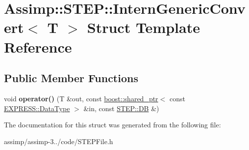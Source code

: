 \hypertarget{struct_assimp_1_1_s_t_e_p_1_1_intern_generic_convert}{\section{Assimp\+:\+:S\+T\+E\+P\+:\+:Intern\+Generic\+Convert$<$ T $>$ Struct Template Reference}
\label{struct_assimp_1_1_s_t_e_p_1_1_intern_generic_convert}
}
\subsection*{Public Member Functions}
\begin{DoxyCompactItemize}
\item 
\hypertarget{struct_assimp_1_1_s_t_e_p_1_1_intern_generic_convert_afcb7f85dbff0d736175b786d2e45bbfe}{void {\bfseries operator()} (T \&out, const \hyperlink{classboost_1_1shared__ptr}{boost\+::shared\+\_\+ptr}$<$ const \hyperlink{class_assimp_1_1_s_t_e_p_1_1_e_x_p_r_e_s_s_1_1_data_type}{E\+X\+P\+R\+E\+S\+S\+::\+Data\+Type} $>$ \&in, const \hyperlink{class_assimp_1_1_s_t_e_p_1_1_d_b}{S\+T\+E\+P\+::\+D\+B} \&)}\label{struct_assimp_1_1_s_t_e_p_1_1_intern_generic_convert_afcb7f85dbff0d736175b786d2e45bbfe}

\end{DoxyCompactItemize}


The documentation for this struct was generated from the following file\+:\begin{DoxyCompactItemize}
\item 
assimp/assimp-\/3../code/S\+T\+E\+P\+File.\+h\end{DoxyCompactItemize}
